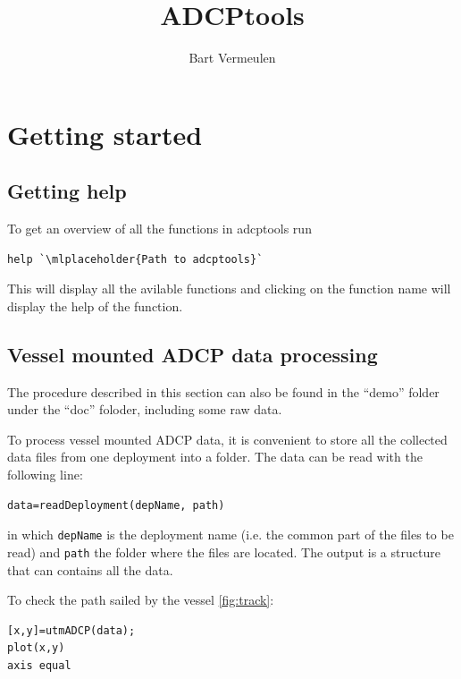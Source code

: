 \documentclass{book}
\author{Bart Vermeulen}
\title{ADCPtools}
\newcommand{\ml}[1]{\lstinline{#1}}
\begin{document}
\maketitle
\chapter{Getting started}
\section{Getting help}
To get an overview of all the functions in adcptools run
\begin{lstlisting}
help `\mlplaceholder{Path to adcptools}`
\end{lstlisting}
This will display all the avilable functions and clicking on the function name will display the help of the function.

\section{Vessel mounted ADCP data processing}
The procedure described in this section can also be found in the ``demo'' folder under the ``doc'' foloder, including some raw data.

To process vessel mounted ADCP data, it is convenient to store all the collected data files from one deployment into a folder.
The data can be read with the following line:
\begin{lstlisting}
data=readDeployment(depName, path)
\end{lstlisting}
in which \ml{depName} is the deployment name (i.e. the common part of the files to be read) and \ml{path} the folder where the files are located.
The output is a structure that can contains all the data.

To check the path sailed by the vessel \autoref{fig:track}:
\begin{lstlisting}
[x,y]=utmADCP(data);
plot(x,y)
axis equal
\end{lstlisting}
\end{document}
